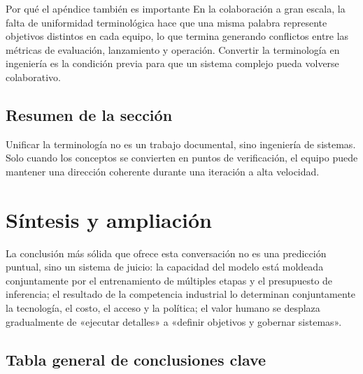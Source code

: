 \documentclass[a4paper]{article}
\begin{document}
\begin{knowledgebox}{Por qué el apéndice también es importante}
En la colaboración a gran escala, la falta de uniformidad terminológica hace que una misma palabra represente objetivos distintos en cada equipo, lo que termina generando conflictos entre las métricas de evaluación, lanzamiento y operación. Convertir la terminología en ingeniería es la condición previa para que un sistema complejo pueda volverse colaborativo.
\end{knowledgebox}

\subsection{Resumen de la sección}

Unificar la terminología no es un trabajo documental, sino ingeniería de sistemas. Solo cuando los conceptos se convierten en puntos de verificación, el equipo puede mantener una dirección coherente durante una iteración a alta velocidad.

\section{Síntesis y ampliación}

La conclusión más sólida que ofrece esta conversación no es una predicción puntual, sino un sistema de juicio: la capacidad del modelo está moldeada conjuntamente por el entrenamiento de múltiples etapas y el presupuesto de inferencia; el resultado de la competencia industrial lo determinan conjuntamente la tecnología, el costo, el acceso y la política; el valor humano se desplaza gradualmente de «ejecutar detalles» a «definir objetivos y gobernar sistemas».

\subsection{Tabla general de conclusiones clave}
\end{document}
